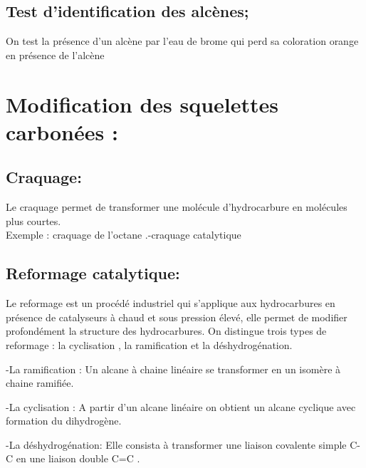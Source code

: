 \documentclass[12pt]{article}
\begin{document}
  



\subsection{Test d'identification des alcènes;}
On test la présence d'un alcène par l'eau de brome qui perd sa coloration orange en présence de l'alcène

\section{Modification des squelettes carbonées :}
\subsection{Craquage:}
Le craquage permet de transformer une molécule d'hydrocarbure en molécules plus courtes.
\\Exemple : craquage de l'octane .-craquage catalytique
\subsection{Reformage catalytique: }
Le reformage est un procédé industriel qui s'applique aux hydrocarbures en présence de catalyseurs à chaud et sous pression élevé, elle permet de modifier profondément la structure des hydrocarbures. On distingue trois types de
reformage : la cyclisation , la ramification et la déshydrogénation.

-La ramification :
Un alcane à chaine linéaire se transformer en un isomère à chaine ramifiée.

-La cyclisation :
A partir d'un alcane linéaire on obtient un alcane cyclique avec formation du dihydrogène.

-La déshydrogénation:
Elle consista à transformer une liaison covalente simple C-C en une liaison double C=C .
\end{document}
